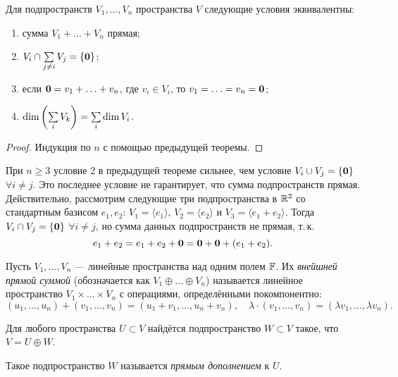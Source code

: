 \begin{theorem}
    Для подпространств $V_1, \ldots, V_n$ пространства $V$ следующие условия эквивалентны:
    \begin{enumerate}[nolistsep]
        \item сумма $V_1 + \ldots + V_n$ прямая;
        \item $V_i \cap \sum\limits_{j \ne i}V_j = \{\boldsymbol{0}\}$;
        \item если $\boldsymbol{0} = v_1 + \ldots + v_n$, где $v_i \in V_i$, то $v_1 = \ldots = v_n = \boldsymbol{0}$;
        \item $\dim\left(\sum\limits_iV_k\right) = \sum\limits_i\dim V_i$.
    \end{enumerate}
\end{theorem}

\begin{proof}
    Индукция по $n$ с помощью предыдущей теоремы.
\end{proof}

\begin{remark}
    При $n \geqslant 3$ условие $2$ в предыдущей теореме сильнее, чем условие $V_i \cup V_j = \{\boldsymbol{0}\}$ $\forall i \ne j$. Это последнее условие не гарантирует, что сумма подпространств прямая. Действительно, рассмотрим следующие три подпространства в $\mathbb{R}^2$ со стандартным базисом $e_1, e_2$: $V_1 = \langle e_1\rangle$, $V_2 = \langle e_2\rangle$ и $V_3 = \langle e_1 + e_2\rangle$. Тогда $V_i \cap V_j = \{\boldsymbol{0}\}$ $\forall i \ne j$, но сумма данных подпространств не прямая, т.\,к. \[e_1 + e_2 = e_1 + e_2 + \boldsymbol{0} = \boldsymbol{0} + \boldsymbol{0} + (e_1 + e_2).\]
\end{remark}

\begin{definition}
    Пусть $V_1, \ldots, V_n$ --- линейные пространства над одним полем $\mathbb{F}$. Их \textit{внейшней прямой суммой} (обозначается как $V_1 \oplus \ldots \oplus V_n$) называется линейное пространство $V_1 \times \ldots \times V_n$ с операциями, определёнными покомпонентно:
    \[
        (u_1, \ldots, u_n) + (v_1, \ldots, v_n) = (u_1 + v_1, \ldots, u_n + v_n),\quad \lambda \cdot (v_1, \ldots, v_n) = (\lambda v_1, \ldots, \lambda v_n).
    \]
\end{definition}

\begin{proposal}
    Для любого пространства $U \subset V$ найдётся подпространство $W \subset V$ такое, что $V = U \oplus W$.
\end{proposal}

\begin{definition}
    Такое подпространство $W$ называется \textit{прямым дополнением} к $U$.
\end{definition}

